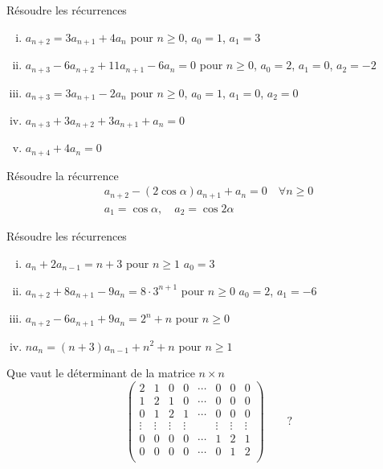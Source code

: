 \begin{exo}
R\'esoudre les r\'ecurrences 
%
\begin{enumerate}[(i)]
\item $a_{n+2} = 3 a_{n+1} + 4 a_{n}$ pour $n \geqslant 0$,\hfill
      $a_0 = 1$, \quad $a_1 = 3$

\item $a_{n+3} - 6 a_{n+2} + 11 a_{n+1} - 6 a_{n}=0$ pour $n \geqslant 0$,\hfill
      $a_0 = 2$, \quad $a_1 = 0$, \quad $a_2 = -2$

\item $a_{n+3} = 3 a_{n+1} - 2 a_{n}$ pour $n \geqslant 0$,\hfill
      $a_0 = 1$, \quad $a_1 = 0$, \quad $a_2 = 0$
      
\item $a_{n+3} + 3 a_{n+2} + 3 a_{n+1} + a_n = 0$

\item $a_{n+4} + 4 a_{n} = 0$     
\end{enumerate}
\end{exo}

\begin{exo}
R\'esoudre la r\'ecurrence
$$
\begin{array}{ll}
a_{n+2} - (2 \cos \alpha) a_{n+1} + a_n = 0\quad \forall n \geqslant 0\\
a_1 = \cos \alpha, \quad a_2 = \cos 2 \alpha
\end{array}
$$
\end{exo}

\begin{exo}
R\'esoudre les r\'ecurrences
%
\begin{enumerate}[(i)]
\item $a_n + 2 a_{n-1} = n+3$ pour $n \geqslant 1$\hfill
      $a_0 = 3$
      
\item $a_{n+2} + 8 a_{n+1} - 9 a_{n} = 8 \cdot 3^{n+1}$ pour $n \geqslant 0$\hfill
      $a_0 = 2$, \quad $a_1 = -6$
      
\item $a_{n+2} - 6 a_{n+1} + 9 a_{n} = 2^n + n$ pour $n \geqslant 0$

\item $n a_n = (n+3) a_{n-1} + n^2 + n$ pour $n \geqslant 1$            
\end{enumerate}
\end{exo}

\begin{exo}
Que vaut le d\'eterminant de la matrice $n \times n$
$$
\left( 
\begin{array}{rrrrrrrr}
2 &1 &0  &0  &\cdots &0 &0 &0\\
1 & 2 &1 &0  &\cdots &0 &0 &0\\
0 & 1 &2  &1 &\cdots &0 &0 &0\\
\vdots & \vdots & \vdots & \vdots && \vdots & \vdots &\vdots\\
0 & 0 & 0 & 0 & \cdots & 1 &2 &1\\
0 & 0 & 0 & 0 & \cdots & 0 &1 &2\\
\end{array}
\right) \qquad ?
$$
\end{exo}


